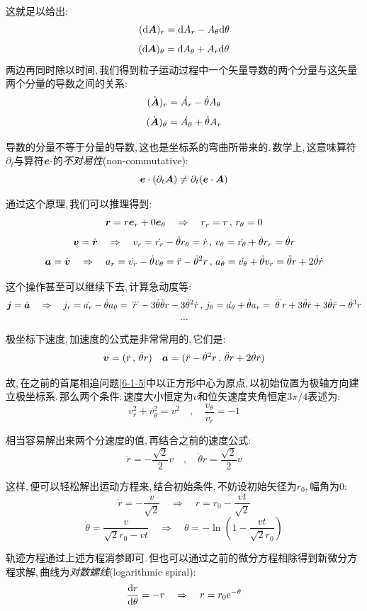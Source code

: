 这就足以给出:
\[(\textrm{d} \boldsymbol{A})_r=\textrm{d} A_r-A_\theta \textrm{d} \theta\]
\[(\textrm{d} \boldsymbol{A})_\theta=\textrm{d} A_\theta+A_r \textrm{d} \theta\]
\newpage
两边再同时除以时间,\,我们得到粒子运动过程中一个矢量导数的两个分量与这矢量两个分量的导数之间的关系:
\[(\dot{\boldsymbol{A}})_r=\dot{A_r}-\dot{\theta}A_\theta\]
\[(\dot{\boldsymbol{A}})_\theta=\dot{A_\theta}+\dot{\theta}A_r\]

导数的分量不等于分量的导数,\,这也是坐标系的弯曲所带来的.\,数学上,\,这意味算符$\partial_t$与算符$\boldsymbol{e}\cdot$的\emph{不对易性}(non-commutative):
\[\boldsymbol{e}\cdot(\partial_t \boldsymbol{A})\neq \partial_t(\boldsymbol{e}\cdot \boldsymbol{A})\]

通过这个原理,\,我们可以推理得到:
\[\boldsymbol{r}=r\boldsymbol{e}_r+0\boldsymbol{e}_\theta\quad \Rightarrow\quad r_r=r\,,\,r_\theta=0\]
\[\boldsymbol{v}=\dot{\boldsymbol{r}}\quad \Rightarrow\quad  v_r=\dot{r_r}-\dot{\theta}r_\theta=\dot{r}\,,\,v_\theta=\dot{r_\theta}+\dot{\theta}r_r=\dot{\theta}r\]
\[\boldsymbol{a}=\dot{\boldsymbol{v}}\quad \Rightarrow\quad  a_r=\dot{v_r}-\dot{\theta}v_\theta=\ddot{r}-\dot{\theta}^2r\,,\,a_\theta=\dot{v_\theta}+\dot{\theta}v_r=\ddot{\theta}r+2\dot{\theta}\dot{r}\]

这个操作甚至可以继续下去,\,计算急动度等:
\[\boldsymbol{j}=\dot{\boldsymbol{a}}\quad \Rightarrow \quad j_r=\dot{a_r}-\dot{\theta}a_\theta=\dddot{r}-3\dot{\theta}\ddot{\theta}r-3\dot{\theta}^2\dot{r}\,,\,j_\theta=\dot{a_\theta}+\dot{\theta}a_r=\dddot{\theta}r+3\ddot{\theta}\dot{r}+3\dot{\theta}\ddot{r}-\dot{\theta}^3r\]
\[\cdots\]

极坐标下速度,\,加速度的公式是非常常用的,\,它们是:
\[\boldsymbol{v}=(\dot{r}\,,\,\dot{\theta}r)\quad\boldsymbol{a}=(\ddot{r}-\dot{\theta}^2r\,,\,\ddot{\theta}r+2\dot{\theta}\dot{r})\]

故,\,在之前的首尾相追问题\ref{6-1-5}中以正方形中心为原点,\,以初始位置为极轴方向建立极坐标系.\,那么两个条件:\,速度大小恒定为$v$和位矢速度夹角恒定$3\pi/4$表述为:
\[v_r^2+v_\theta^2=v^2\quad ,\quad \frac{v_\theta}{v_r}=-1\]

相当容易解出来两个分速度的值,\,再结合之前的速度公式:
\[\dot{r}=-\frac{\sqrt{2}}{2}v\quad ,\quad \dot{\theta}r=\frac{\sqrt{2}}{2}v\]

这样,\,便可以轻松解出运动方程来,\,结合初始条件,\,不妨设初始矢径为$r_0$,\,幅角为$0$:
\[\dot{r}=-\frac{v}{\sqrt{2}}\quad \Rightarrow \quad r=r_0-\frac{vt}{\sqrt{2}}\]
\[\dot{\theta}=\frac{v}{\sqrt{2}r_0-vt}\quad \Rightarrow \quad  \theta =-\ln\left(1-\frac{vt}{\sqrt{2}r_0}\right)\]

轨迹方程通过上述方程消参即可.\,但也可以通过之前的微分方程相除得到新微分方程求解,\,曲线为\emph{对数螺线}(logarithmic spiral):
\[\frac{\textrm{d} r}{\textrm{d} \theta}=-r\quad \Rightarrow \quad r=r_0{\rm e}^{-\theta}\]

